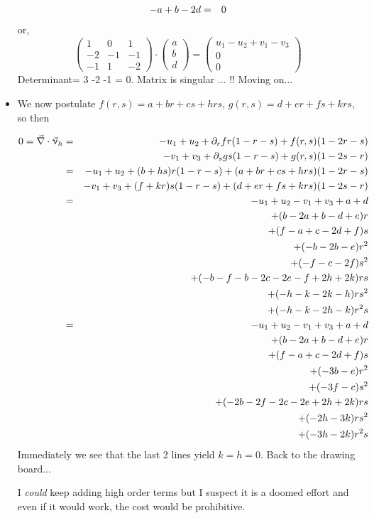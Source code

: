 \begin{itemize}
\begin{eqnarray}
-a + b-2d &=& 0 \nonumber
\end{eqnarray}
or, 
\[
\left(
\begin{array}{ccc}
1 &0 & 1 \\
-2 & -1 & -1 \\
-1 & 1 & -2 
\end{array}
\right)
\cdot
\left(
\begin{array}{c}
a \\ b  \\d 
\end{array}
\right)
=
\left(
\begin{array}{c}
u_1-u_2+v_1-v_3 \\
0 \\ 0 
\end{array}
\right)
\]
Determinant= 3 -2 -1 = 0. Matrix is singular ... !! Moving on...

\item We now postulate $f(r,s)=a+br+cs+hrs$, $g(r,s)=d+er+fs+krs$, so then 


\begin{eqnarray}
0=\vec\nabla\cdot\vec\upnu_h 
&=& -u_1+u_2 + \partial_r f r(1-r-s) + f(r,s)(1-2r-s) \nonumber\\
&&  -v_1+v_3 + \partial_s g s(1-r-s) + g(r,s)(1-2s-r) \nonumber\\
&=& -u_1+u_2 + (b+hs) r(1-r-s) + (a+br+cs+hrs) (1-2r-s) \nonumber\\
&&  -v_1+v_3 + (f+kr) s(1-r-s) + (d+er+fs+krs)(1-2s-r) \nonumber\\
&=& -u_1+u_2  -v_1+v_3 + a + d \nonumber\\
&& +(b-2a+b-d+e)r \nonumber\\
&& +(f-a+c-2d+f)s \nonumber\\
&& +(-b-2b-e)r^2 \nonumber\\
&& +(-f-c-2f)s^2 \nonumber\\
&& +(-b-f-b-2c-2e-f+2h+2k)rs \nonumber\\
&& +(-h-k-2k-h)rs^2 \nonumber\\
&& +(-h-k-2h-k)r^2s \nonumber\\
&=& -u_1+u_2  -v_1+v_3 + a + d \nonumber\\
&& +(b-2a+b-d+e)r \nonumber\\
&& +(f-a+c-2d+f)s \nonumber\\
&& +(-3b-e)r^2 \nonumber\\
&& +(-3f-c)s^2 \nonumber\\
&& +(-2b-2f-2c-2e+2h+2k)rs \nonumber\\
&& +(-2h-3k)rs^2 \nonumber\\
&& +(-3h-2k)r^2s 
\end{eqnarray}
Immediately we see that the last 2 lines yield $k=h=0$. Back to the drawing board...

I {\it could} keep adding high order terms but I suspect it is a doomed effort and even if it would work, the cost would be prohibitive.

\end{itemize}


